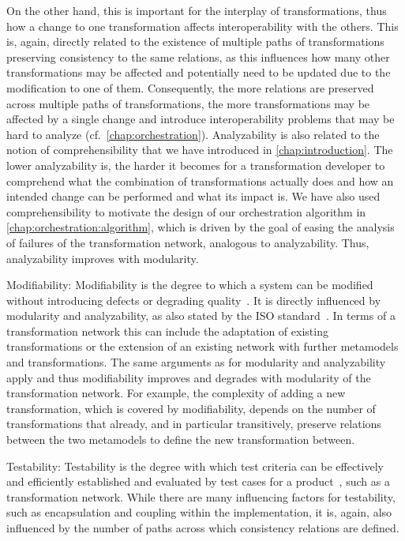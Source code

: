\begin{properdescription}
    On the other hand, this is important for the interplay of transformations, thus how a change to one transformation affects interoperability with the others.
    This is, again, directly related to the existence of multiple paths of transformations preserving consistency to the same relations, as this influences how many other transformations may be affected and potentially need to be updated due to the modification to one of them.
    Consequently, the more relations are preserved across multiple paths of transformations, the more transformations may be affected by a single change and introduce interoperability problems that may be hard to analyze (cf.\ \autoref{chap:orchestration}).
    Analyzability is also related to the notion of comprehensibility that we have introduced in \autoref{chap:introduction}. The lower analyzability is, the harder it becomes for a transformation developer to comprehend what the combination of transformations actually does and how an intended change can be performed and what its impact is.
    We have also used comprehensibility to motivate the design of our orchestration algorithm in \autoref{chap:orchestration:algorithm}, which is driven by the goal of easing the analysis of failures of the transformation network, analogous to analyzability.
    Thus, analyzability improves with modularity.
    \item[Modifiability:]
    Modifiability is the degree to which a system can be modified without introducing defects or degrading quality~\cite{iso25010}.
    It is directly influenced by modularity and analyzability, as also stated by the ISO standard~\cite{iso25010}.
    In terms of a transformation network this can include the adaptation of existing transformations or the extension of an existing network with further metamodels and transformations.
    The same arguments as for modularity and analyzability apply and thus modifiability improves and degrades with modularity of the transformation network.
    For example, the complexity of adding a new transformation, which is covered by modifiability, depends on the number of transformations that already, and in particular transitively, preserve relations between the two metamodels to define the new transformation between.
    \item[Testability:]
    Testability is the degree with which test criteria can be effectively and efficiently established and evaluated by test cases for a product~\cite{iso25010}, such as a transformation network.
    While there are many influencing factors for testability, such as encapsulation and coupling within the implementation, it is, again, also influenced by the number of paths across which consistency relations are defined.

\end{properdescription}
